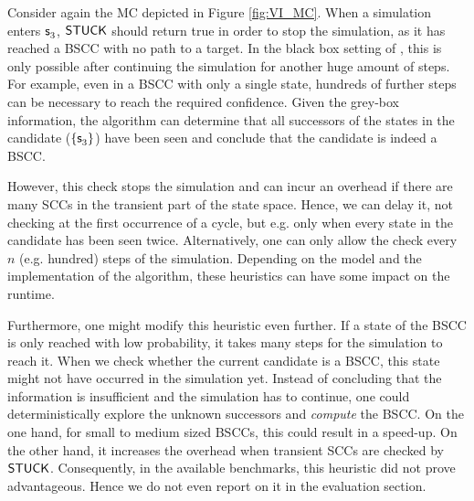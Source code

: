 \begin{example}
	Consider again the MC depicted in Figure \ref{fig:VI_MC}.
	When a simulation enters $\state<3>$, $\mathsf{STUCK}$ should return true in order to stop the simulation, as it has reached a BSCC with no path to a target.
	In the black box setting of \cite{DHKP16}, this is only possible after continuing the simulation for another huge amount of steps. 
	For example, even in a BSCC with only a single state, hundreds of further steps can be necessary to reach the required confidence.
	Given the grey-box information, the algorithm can determine that all successors of the states in the candidate ($\{\state<3>\}$) have been seen and conclude that the candidate is indeed a BSCC.
\end{example}

However, this check stops the simulation and can incur an overhead if there are many SCCs in the transient part of the state space. 
Hence, we can delay it, not checking at the first occurrence of a cycle, but e.g. only when every state in the candidate has been seen twice.
Alternatively, one can only allow the check every $n$ (e.g. hundred) steps of the simulation.
Depending on the model and the implementation of the algorithm, these heuristics can have some impact on the runtime.

Furthermore, one might modify this heuristic even further.
If a state of the BSCC is only reached with low probability, it takes many steps for the simulation to reach it.
When we check whether the current candidate is a BSCC, this state might not have occurred in the simulation yet. 
Instead of concluding that the information is insufficient and the simulation has to continue, one could deterministically explore the unknown successors and \emph{compute} the BSCC.
On the one hand, for small to medium sized BSCCs, this could result in a speed-up. 
On the other hand,  it increases the overhead when transient SCCs are checked by $\mathsf{STUCK}$.
Consequently, in the available benchmarks, this heuristic did not prove advantageous.
Hence we do not even report on it in the evaluation section.

